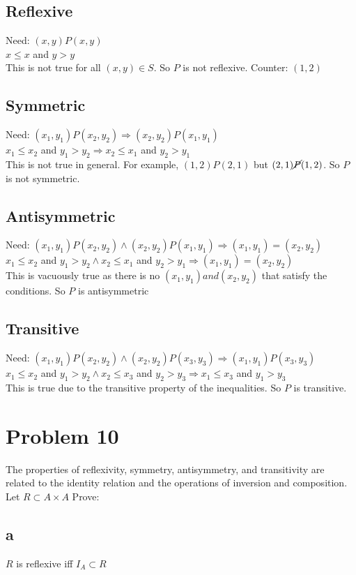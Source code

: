 \documentclass{article}
\begin{document}
\subsection*{Reflexive}
Need: $(x, y) P (x, y)$ \\
$x \leq x$ and $y > y$ \\
This is not true for all $(x, y) \in S$. So $P$ is not reflexive. Counter: $(1, 2)$
\subsection*{Symmetric}
Need: $(x_1, y_1) P (x_2, y_2) \Rightarrow (x_2, y_2) P (x_1, y_1)$ \\
$x_1 \leq x_2$ and $y_1 > y_2 \Rightarrow x_2 \leq x_1$ and $y_2 > y_1$ \\
This is not true in general. For example, $(1, 2) P (2, 1)$ but $(2, 1) \cancel{P} (1, 2)$. So $P$ is not symmetric.
\subsection*{Antisymmetric}
Need: $(x_1, y_1) P (x_2, y_2) \land (x_2, y_2) P (x_1, y_1) \Rightarrow (x_1, y_1) = (x_2, y_2)$ \\
$x_1 \leq x_2$ and $y_1 > y_2 \land x_2 \leq x_1$ and $y_2 > y_1 \Rightarrow (x_1, y_1) = (x_2, y_2)$ \\
This is vacuously true as there is no $(x_1, y_1) and (x_2, y_2)$ that satisfy the conditions. So $P$ is antisymmetric
\subsection*{Transitive}
Need: $(x_1, y_1) P (x_2, y_2) \land (x_2, y_2) P (x_3, y_3) \Rightarrow (x_1, y_1) P (x_3, y_3)$ \\
$x_1 \leq x_2$ and $y_1 > y_2 \land x_2 \leq x_3$ and $y_2 > y_3 \Rightarrow x_1 \leq x_3$ and $y_1 > y_3$ \\
This is true due to the transitive property of the inequalities. So $P$ is transitive.

\section*{Problem 10}
The properties of reflexivity, symmetry, antisymmetry, and transitivity are related to the
identity relation and the operations of inversion and composition. Let $R \subset A \times A$ Prove:
\subsection*{a}
$R$ is reflexive iff $I_A \subset R$
\end{document}
